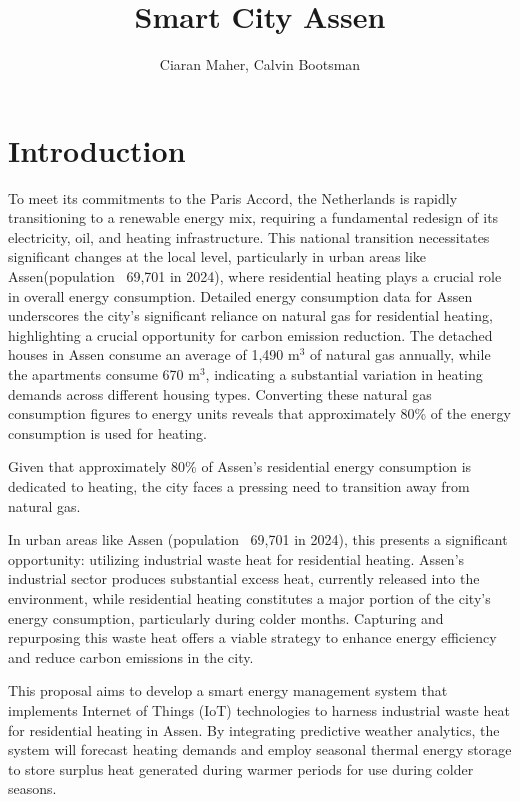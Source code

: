 \documentclass{article}
\title{Smart City Assen}
\author{Ciaran Maher, Calvin Bootsman}
\begin{document}
\maketitle
\section{Introduction}
To meet its commitments to the Paris Accord, the Netherlands is rapidly transitioning to a renewable energy mix, requiring a fundamental redesign of its electricity, oil, and heating infrastructure\cite{paris_agreement}. This national transition necessitates significant changes at the local level, particularly in urban areas like Assen(population ~69,701 in 2024\cite{allecijfers}), where residential heating plays a crucial role in overall energy consumption. Detailed energy consumption data for Assen underscores the city's significant reliance on natural gas for residential heating, highlighting a crucial opportunity for carbon emission reduction. The detached houses in Assen consume an average of 1,490 m$^3$ of natural gas annually, while the apartments consume 670 m$^3$\cite{assen_woningen}, indicating a substantial variation in heating demands across different housing types. Converting these natural gas consumption figures to energy units reveals that approximately 80\% of the energy consumption is used for heating.

Given that approximately 80\% of Assen's residential energy consumption is dedicated to heating, the city faces a pressing need to transition away from natural gas. 

In urban areas like Assen (population ~69,701 in 2024\cite{allecijfers}), this presents a significant opportunity: utilizing industrial waste heat for residential heating. Assen's industrial sector produces substantial excess heat, currently released into the environment, while residential heating constitutes a major portion of the city's energy consumption, particularly during colder months. Capturing and repurposing this waste heat offers a viable strategy to enhance energy efficiency and reduce carbon emissions in the city\cite{allecijfers}. 

This proposal aims to develop a smart energy management system that implements Internet of Things (IoT) technologies to harness industrial waste heat for residential heating in Assen. By integrating predictive weather analytics, the system will forecast heating demands and employ seasonal thermal energy storage to store surplus heat generated during warmer periods for use during colder seasons.
\end{document}
